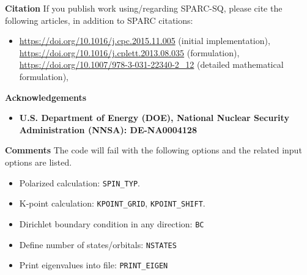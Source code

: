 \begin{frame}[allowframebreaks]{\textbf{Citation}} \label{Citation}
If you publish work using/regarding SPARC-SQ, please cite the following articles, in addition to SPARC citations:
\begin{itemize}
    \item \url{https://doi.org/10.1016/j.cpc.2015.11.005} (initial implementation),
     \url{https://doi.org/10.1016/j.cplett.2013.08.035} (formulation),
    \url{https://doi.org/10.1007/978-3-031-22340-2_12} (detailed mathematical formulation),

\end{itemize}
\end{frame}

\begin{frame}[allowframebreaks]{\textbf{Acknowledgements}} \label{Acknowledgements}
\begin{itemize}
    \item \textbf{U.S. Department of Energy (DOE), National Nuclear Security Administration (NNSA): DE-NA0004128 
        } \\
\end{itemize}
\end{frame}

\begin{frame}[allowframebreaks]{\textbf{Comments}} \label{Introduction}
The code will fail with the following options and the related input options are listed.
\begin{itemize}
  \item Polarized calculation: \texttt{SPIN\_TYP}.
  \item K-point calculation: \texttt{KPOINT\_GRID}, \texttt{KPOINT\_SHIFT}.
  \item Dirichlet boundary condition in any direction: \texttt{BC}
  \item Define number of states/orbitals: \texttt{NSTATES}
  \item Print eigenvalues into file: \texttt{PRINT\_EIGEN}
\end{itemize}

\end{frame}


